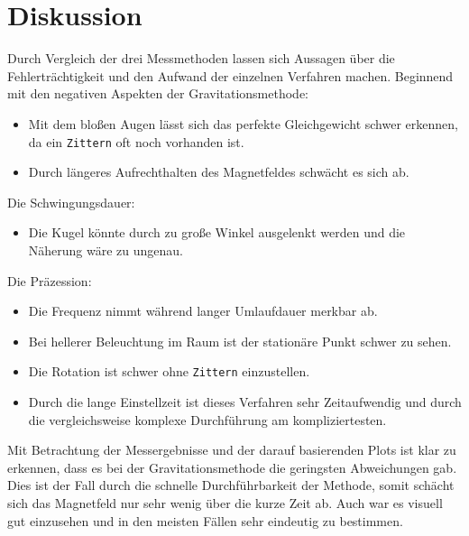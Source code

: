 \section{Diskussion}
\label{sec:Diskussion}
Durch Vergleich der drei Messmethoden lassen sich Aussagen über die Fehlerträchtigkeit und den Aufwand der einzelnen Verfahren machen.
Beginnend mit den negativen Aspekten der Gravitationsmethode:
\begin{itemize}
    \item Mit dem bloßen Augen lässt sich das perfekte Gleichgewicht schwer erkennen, da ein \texttt{\glqq Zittern\dq} oft noch vorhanden ist.
    \item Durch längeres Aufrechthalten des Magnetfeldes schwächt es sich ab.
\end{itemize}
Die Schwingungsdauer:
\begin{itemize}
    \item Die Kugel könnte durch zu große Winkel ausgelenkt werden und die Näherung wäre zu ungenau. 
\end{itemize}
Die Präzession:
\begin{itemize}
    \item Die Frequenz nimmt während langer Umlaufdauer merkbar ab.
    \item Bei hellerer Beleuchtung im Raum ist der stationäre Punkt schwer zu sehen.
    \item Die Rotation ist schwer ohne \texttt{\glqq Zittern\dq} einzustellen.
    \item Durch die lange Einstellzeit ist dieses Verfahren sehr Zeitaufwendig und durch die vergleichsweise komplexe Durchführung am kompliziertesten.
\end{itemize}

Mit Betrachtung der Messergebnisse und der darauf basierenden Plots ist klar zu erkennen, dass es bei der Gravitationsmethode die geringsten Abweichungen gab. 
Dies ist der Fall durch die schnelle Durchführbarkeit der Methode, somit schächt sich das Magnetfeld nur sehr wenig über die kurze Zeit ab.
Auch war es visuell gut einzusehen und in den meisten Fällen sehr eindeutig zu bestimmen. 